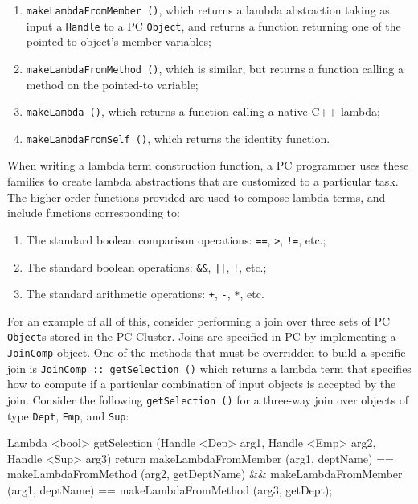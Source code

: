 \begin{enumerate}

\item \texttt{makeLambdaFromMember ()}, which returns 
a lambda abstraction taking as input a \texttt{Handle} to a PC \texttt{Object}, and returns a function returning one of the pointed-to object's member variables;

\item 
\texttt{makeLambdaFromMethod ()}, which is similar, but returns a function calling a method on the pointed-to variable;

\item \texttt{makeLambda ()}, which returns a function calling
a native C++ lambda;

\item \texttt{makeLambdaFromSelf ()}, which returns the identity function.

\end{enumerate}

\noindent
When writing a lambda term construction function, a PC programmer uses these families to create lambda abstractions that
are customized to a particular task.
The higher-order functions provided are used to compose lambda terms, and
include functions corresponding to:

\begin{enumerate}
\item
The standard boolean comparison operations: \texttt{==}, \texttt{>}, \texttt{!=}, etc.;

\item
The standard boolean
operations: \texttt{\&\&}, \texttt{||}, \texttt{!}, etc.;

\item
The standard arithmetic operations: \texttt{+}, \texttt{-}, \texttt{*}, etc.  
\end{enumerate}

For an example of all of this, consider performing a join over three
sets of PC \texttt{Object}s stored in the PC Cluster.  
Joins are specified in PC 
by implementing a \texttt{JoinComp} object. One of the methods that must be overridden to build a specific join is \texttt{JoinComp :: getSelection ()}
which returns a lambda term
that specifies how to compute if a particular combination of input objects is accepted by the join.  Consider the following
\texttt{getSelection ()} for a three-way join over objects of type \texttt{Dept}, \texttt{Emp}, and \texttt{Sup}:


\begin{codesmall} 
Lambda <bool> getSelection (Handle <Dep> arg1, 
    Handle <Emp> arg2, Handle <Sup> arg3) {
	return makeLambdaFromMember (arg1, deptName) == 
	       makeLambdaFromMethod (arg2, getDeptName) &&
	       makeLambdaFromMember (arg1, deptName) == 
               makeLambdaFromMethod (arg3, getDept);   }
\end{codesmall}

